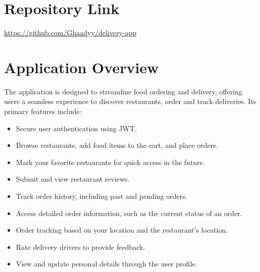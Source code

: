 \documentclass{article}
\begin{document}


\section*{Repository Link}

\href{https://github.com/Ghaadyy/delivery-app}{https://github.com/Ghaadyy/delivery-app}

\section*{Application Overview}
The application is designed to streamline food ordering and delivery, offering users a seamless experience to discover restaurants, order and track deliveries. Its primary features include:
\begin{itemize}
    \item Secure user authentication using JWT.
    \item Browse restaurants, add food items to the cart, and place orders.
    \item Mark your favorite restaurants for quick access in the future.
    \item Submit and view restaurant reviews.
    \item Track order history, including past and pending orders.
    \item Access detailed order information, such as the current status of an order.
    \item Order tracking based on your location and the restaurant's location.
    \item Rate delivery drivers to provide feedback.
    \item View and update personal details through the user profile.
\end{itemize}
\end{document}
